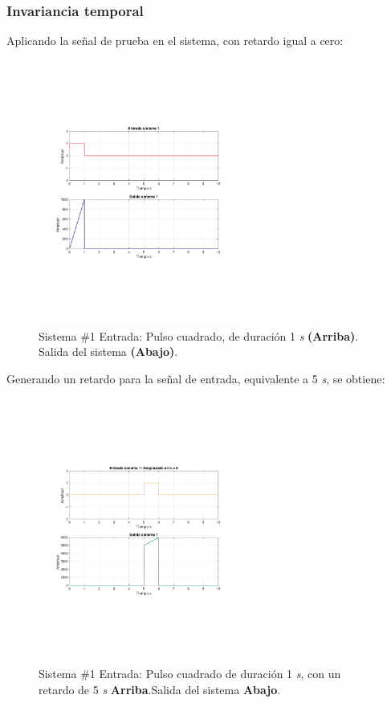 		\subsubsection{Invariancia temporal}
			Aplicando la señal de prueba en el sistema, con retardo igual a cero:
			\begin{figure}[H]
				\center
				\includegraphics[width=0.6\textwidth,clip, trim = {2cm 7.0cm 2.2cm 7.0cm}]{../imgs/sistema_1_invarianza_temporal_noretardo.pdf}
				\caption{Sistema \#1 Entrada: Pulso cuadrado, de duración 1 \textit{s} \textbf{(Arriba)}. Salida del sistema \textbf{(Abajo)}.}
				\label{fig:s_1_time_invariant_test_1}
			\end{figure}
			
			Generando un retardo para la señal de entrada, equivalente a 5 \textit{s}, se obtiene:
			
			\begin{figure}[H]
				\center
				\includegraphics[width=0.6\textwidth,clip, trim = {2cm 7.0cm 2.2cm 7.0cm}]{../imgs/sistema_1_invarianza_temporal_retardo.pdf}
				\caption{Sistema \#1 Entrada: Pulso cuadrado de duración 1 \textit{s}, con un retardo de 5 \textit{s} \textbf{Arriba}.Salida del sistema \textbf{Abajo}.}
				\label{fig:s_1_time_invariant_test_2}
			\end{figure}
			
